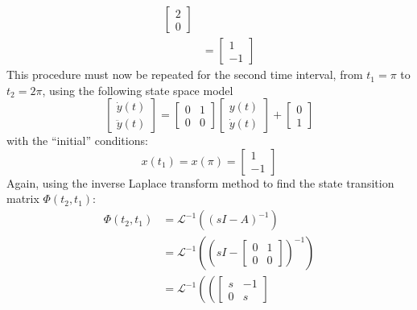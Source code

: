 \begin{example}
\begin{equation*}
\begin{split}
      \begin{bmatrix}
        2 \\ 0
      \end{bmatrix} \\
      &=
      \begin{bmatrix}
        1 \\ -1
      \end{bmatrix}
    \end{split}
  \end{equation*}
  This procedure must now be repeated for the second time interval, from $t_{1}=\pi$ to $t_{2}=2\pi$, using the following state space model
  \begin{equation*}
    \begin{bmatrix}
      \dot{y}(t) \\ \ddot{y}(t)
    \end{bmatrix}=
    \begin{bmatrix}
      0 & 1 \\ 0 & 0
    \end{bmatrix}
    \begin{bmatrix}
      y(t) \\ \dot{y}(t)
    \end{bmatrix}+
    \begin{bmatrix}
      0 \\ 1
    \end{bmatrix}
  \end{equation*}
  with the ``initial'' conditions:
  \begin{equation*}
    x(t_{1})=x(\pi)=\begin{bmatrix} 1 \\ -1 \end{bmatrix}
  \end{equation*}
  Again, using the inverse Laplace transform method to find the state transition matrix $\Phi(t_{2},t_{1})$:
  \begin{equation*}
    \begin{split}
      \Phi(t_{2},t_{1})&=\mathscr{L}^{-1}((sI-A)^{-1}) \\
      &=\mathscr{L}^{-1}\left(
      \left(sI-\begin{bmatrix}
      0 & 1 \\ 0 & 0
      \end{bmatrix}\right)^{-1}
      \right) \\
      &=\mathscr{L}^{-1}\left(
      \left(\begin{bmatrix}
      s & -1 \\ 0 & s

\end{bmatrix}
\end{split}
\end{equation*}
\end{example}
